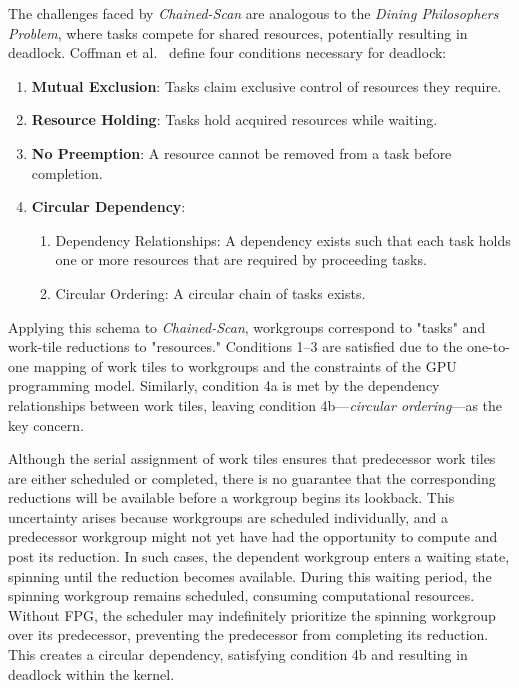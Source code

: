 \documentclass[sigconf]{acmart}
\begin{document}
The challenges faced by \emph{Chained-Scan} are analogous to the \emph{Dining Philosophers Problem}, where tasks compete for shared resources, potentially resulting in deadlock. Coffman et al.~\cite{10.1145/356586.356588} define four conditions necessary for deadlock:
\begin{enumerate}
  \item \textbf{Mutual Exclusion}: Tasks claim exclusive control of resources they require.
  \item \textbf{Resource Holding}: Tasks hold acquired resources while waiting.
  \item \textbf{No Preemption}: A resource cannot be removed from a task before completion.
  \item \textbf{Circular Dependency}:
        \begin{enumerate}
          \item Dependency Relationships: A dependency exists such that each task holds one or more resources that are required by proceeding tasks.
          \item Circular Ordering: A circular chain of tasks exists.
        \end{enumerate}
\end{enumerate}
Applying this schema to \emph{Chained-Scan}, workgroups correspond to "tasks" and work-tile reductions to "resources." Conditions 1–3 are satisfied due to the one-to-one mapping of work tiles to workgroups and the constraints of the GPU programming model. Similarly, condition 4a is met by the dependency relationships between work tiles, leaving condition 4b---\emph{circular ordering}---as the key concern.

Although the serial assignment of work tiles ensures that predecessor work tiles are either scheduled or completed, there is no guarantee that the corresponding reductions will be available before a workgroup begins its lookback. This uncertainty arises because workgroups are scheduled individually, and a predecessor workgroup might not yet have had the opportunity to compute and post its reduction. In such cases, the dependent workgroup enters a waiting state, spinning until the reduction becomes available. During this waiting period, the spinning workgroup remains scheduled, consuming computational resources. Without FPG, the scheduler may indefinitely prioritize the spinning workgroup over its predecessor, preventing the predecessor from completing its reduction. This creates a circular dependency, satisfying condition 4b and resulting in deadlock within the kernel.
\end{document}
